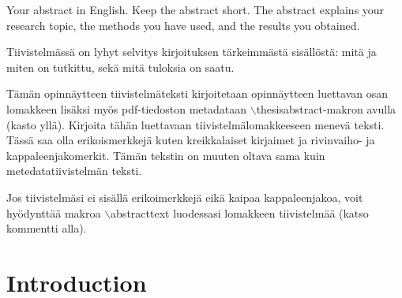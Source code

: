 \documentclass[english, 12pt, a4paper, sci, utf8, a-1b, online]{aaltothesis}
\date{14.10.2020}
\begin{document}
\makecoverpage{}


\makecopyrightpage{}


\begin{abstractpage}[english]
Your abstract in English. Keep the abstract short. The abstract explains your
research topic, the methods you have used, and the results you obtained.
\end{abstractpage}

\newpage



\begin{abstractpage}[finnish]
Tiivistelmässä on lyhyt selvitys kirjoituksen tärkeimmästä sisällöstä: mitä ja
miten on tutkittu, sekä mitä tuloksia on saatu.

Tämän opinnäytteen tiivistelmäteksti kirjoitetaan opinnäytteen luettavan osan 
lomakkeen lisäksi myös pdf-tiedoston metadataan 
$\backslash$thesisabstract-makron avulla (kasto yllä). Kirjoita tähän
luettavaan tiivistelmälomakkeeseen menevä teksti. Tässä saa olla erikoismerkkejä
kuten kreikkalaiset kirjaimet ja rivinvaiho- ja kappaleenjakomerkit. Tämän
tekstin on muuten oltava sama kuin metedatatiivistelmän teksti.

Jos tiivistelmäsi ei sisällä erikoimerkkejä eikä kaipaa kappaleenjakoa, voit
hyödynttää makroa $\backslash$abstracttext luodessasi lomakkeen tiivistelmää
(katso kommentti alla).

\end{abstractpage}


\thesistableofcontents

\cleardoublepage

\section{Introduction}

\end{document}
